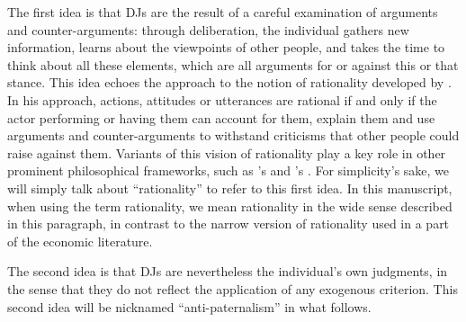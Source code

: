 \documentclass[version=3.21, pagesize, twoside=off, bibliography=totoc, DIV=calc, fontsize=12pt, a4paper, french, english]{scrartcl}
\begin{document}
The first idea is that \acp{DJ} are the result of a careful examination of arguments and counter-arguments: through deliberation, the individual gathers new information, learns about the viewpoints of other people, and takes the time to think about all these elements, 
which are all arguments for or against this or that stance. 
This idea echoes the approach to the notion of rationality developed by \citet{habermas_theorie_1981}.
In his approach, actions, attitudes or utterances are rational if and only if the actor performing or having them can account for them, explain them and use arguments and counter-arguments to withstand criticisms that other people could raise against them. 
Variants of this vision of rationality play a key role in other prominent philosophical frameworks, such as \citeauthor{scanlon_what_2000}’s \citeyearpar{scanlon_what_2000} and \citeauthor{sen_idea_2009}’s \citeyearpar{sen_idea_2009}. 
For simplicity’s sake, we will simply talk about “rationality” to refer to this first idea.%
In this manuscript, when using the term rationality, we mean rationality in the wide sense described in this paragraph, in contrast to the narrow version of rationality used in a part of the economic literature.

The second idea is that \acp{DJ} are nevertheless the individual’s own judgments, in the sense that they do not reflect the application of any exogenous criterion. 
This second idea will be nicknamed “anti-paternalism” in what follows.
\end{document}
